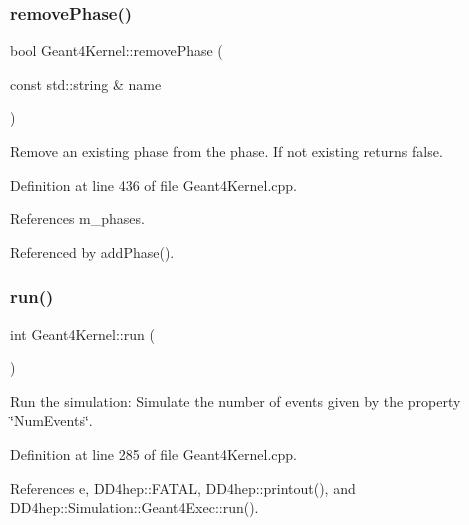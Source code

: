 \subsubsection{\texorpdfstring{remove\+Phase()}{removePhase()}}
{\footnotesize\ttfamily bool Geant4\+Kernel\+::remove\+Phase (\begin{DoxyParamCaption}\item[{const std\+::string \&}]{name }\end{DoxyParamCaption})\hspace{0.3cm}{\ttfamily [virtual]}}



Remove an existing phase from the phase. If not existing returns false. 



Definition at line 436 of file Geant4\+Kernel.\+cpp.



References m\+\_\+phases.



Referenced by add\+Phase().

\hypertarget{class_d_d4hep_1_1_simulation_1_1_geant4_kernel_ad04026c76cad51506b859ccefffffba8}{}\label{class_d_d4hep_1_1_simulation_1_1_geant4_kernel_ad04026c76cad51506b859ccefffffba8} 
\subsubsection{\texorpdfstring{run()}{run()}}
{\footnotesize\ttfamily int Geant4\+Kernel\+::run (\begin{DoxyParamCaption}{ }\end{DoxyParamCaption})\hspace{0.3cm}{\ttfamily [virtual]}}



Run the simulation\+: Simulate the number of events given by the property \char`\"{}\+Num\+Events\char`\"{}. 



Definition at line 285 of file Geant4\+Kernel.\+cpp.



References e, D\+D4hep\+::\+F\+A\+T\+AL, D\+D4hep\+::printout(), and D\+D4hep\+::\+Simulation\+::\+Geant4\+Exec\+::run().



